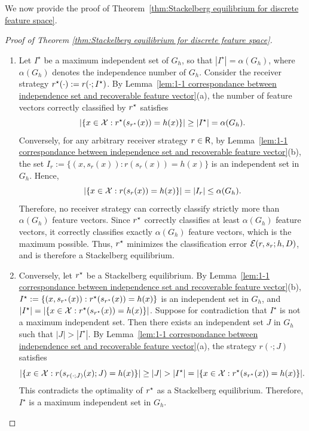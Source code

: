 We now provide the proof of Theorem~\ref{thm:Stackelberg equilibrium for discrete feature space}.

\begin{proof}[Proof of Theorem \ref{thm:Stackelberg equilibrium for discrete feature space}]\label{proof:Stackelberg discrete}
	\begin{enumerate}[label=(\alph*)]
		\item Let $I^{\star}$ be a maximum independent set of $G_h$, so that $|I^\star| = \alpha(G_h)$, where $\alpha(G_h)$ denotes the independence number of $G_h$. Consider the receiver strategy $r^{\star}(\cdot) := r(\cdot; I^{\star})$. By Lemma~\ref{lem:1-1 correspondance between independence set and recoverable feature vector}(a), the number of feature vectors correctly classified by $r^{\star}$ satisfies
		\begin{equation*}
			|\{x \in \mathcal{X}: r^{\star}(s_{r^{\star}}(x)) = h(x)\}| \geq |I^{\star}| = \alpha(G_h).
		\end{equation*}
		Conversely, for any arbitrary receiver strategy $r \in \mathsf{R}$, by Lemma~\ref{lem:1-1 correspondance between independence set and recoverable feature vector}(b), the set $I_r := \{(x,s_r(x)): r(s_r(x)) = h(x)\}$ is an independent set in $G_h$. Hence,
		\begin{equation*}
			|\{x \in \mathcal{X}: r(s_r(x)) = h(x)\}| = |I_r| \leq \alpha(G_h).
		\end{equation*}
		Therefore, no receiver strategy can correctly classify strictly more than $\alpha(G_h)$ feature vectors. Since $r^{\star}$ correctly classifies at least $\alpha(G_h)$ feature vectors, it correctly classifies exactly $\alpha(G_h)$ feature vectors, which is the maximum possible. Thus, $r^{\star}$ minimizes the classification error $\mathcal{E}(r,s_r;h,D)$, and is therefore a Stackelberg equilibrium.
		
		\item Conversely, let $r^{\star}$ be a Stackelberg equilibrium. By Lemma~\ref{lem:1-1 correspondance between independence set and recoverable feature vector}(b), $I^{\star} := \{(x,s_{r^{\star}}(x)): r^{\star}(s_{r^{\star}}(x)) = h(x)\}$ is an independent set in $G_h$, and $|I^\star| = |\{x \in \mathcal{X}: r^{\star}(s_{r^{\star}}(x)) = h(x)\}|$. Suppose for contradiction that $I^{\star}$ is not a maximum independent set. Then there exists an independent set $J$ in $G_h$ such that $|J| > |I^\star|$. By Lemma~\ref{lem:1-1 correspondance between independence set and recoverable feature vector}(a), the strategy $r(\cdot; J)$ satisfies
		\begin{equation*}
			|\{x \in \mathcal{X}: r(s_{r(\cdot;J)}(x); J) = h(x)\}| \geq |J| > |I^\star| = |\{x \in \mathcal{X}: r^{\star}(s_{r^{\star}}(x)) = h(x)\}|.
		\end{equation*}
		This contradicts the optimality of $r^{\star}$ as a Stackelberg equilibrium. Therefore, $I^{\star}$ is a maximum independent set in $G_h$.
	\end{enumerate}
\end{proof}
